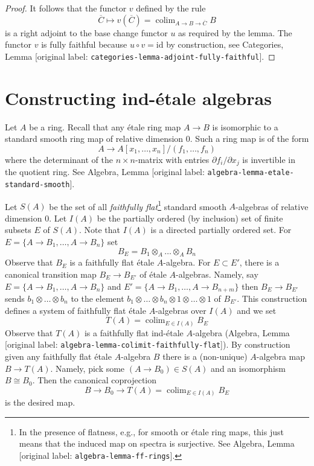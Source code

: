 \documentclass[10pt,a4paper]{article}
\theoremstyle{plain}
\theoremstyle{definition}
\theoremstyle{remark}
\numberwithin{equation}{subsection}
\def\colim{\mathop{\mathrm{colim}}\nolimits}
\begin{document}
\begin{proof}
\medskip\noindent
It follows that the functor $v$ defined by the rule
$$
\overline{C} 
\longmapsto
v(\overline{C}) = \colim_{A \to B \to \overline{C}} B
$$
is a right adjoint to the base change functor $u$ as required by the lemma.
The functor $v$ is fully faithful because
$u \circ v = \text{id}$ by construction, see
Categories, Lemma \textnormal{[original label: \nolinkurl{categories-lemma-adjoint-fully-faithful}]}.
\end{proof}









\section{Constructing ind-\'etale algebras}
\label{section-construction-ind-etale}

\noindent
Let $A$ be a ring. Recall that any \'etale ring map $A \to B$ is isomorphic
to a standard smooth ring map of relative dimension $0$. Such a ring map
is of the form
$$
A \longrightarrow A[x_1, \ldots, x_n]/(f_1, \ldots, f_n)
$$
where the determinant of the $n \times n$-matrix with entries
$\partial f_i/\partial x_j$ is invertible in the quotient ring. See
Algebra, Lemma \textnormal{[original label: \nolinkurl{algebra-lemma-etale-standard-smooth}]}.

\medskip\noindent
Let $S(A)$ be the set of all {\it faithfully flat}\footnote{In the presence
of flatness, e.g., for smooth or \'etale ring maps,
this just means that the induced map on spectra is surjective. See
Algebra, Lemma \textnormal{[original label: \nolinkurl{algebra-lemma-ff-rings}]}.}
standard smooth $A$-algebras of relative dimension $0$.
Let $I(A)$ be the partially ordered (by inclusion) set of finite
subsets $E$ of $S(A)$. Note that $I(A)$ is a directed partially
ordered set. For $E = \{A \to B_1, \ldots, A \to B_n\}$ set
$$
B_E = B_1 \otimes_A \ldots \otimes_A B_n
$$
Observe that $B_E$ is a faithfully flat \'etale $A$-algebra.
For $E \subset E'$, there is a canonical transition map $B_E \to B_{E'}$
of \'etale $A$-algebras. Namely, say $E = \{A \to B_1, \ldots, A \to B_n\}$
and $E' = \{A \to B_1, \ldots, A \to B_{n + m}\}$ then
$B_E \to B_{E'}$ sends $b_1 \otimes \ldots \otimes b_n$ to the
element $b_1 \otimes \ldots \otimes b_n \otimes 1 \otimes \ldots \otimes 1$
of $B_{E'}$. This construction defines a system of faithfully flat
\'etale $A$-algebras over $I(A)$ and we set
$$
T(A) = \colim_{E \in I(A)} B_E
$$
Observe that $T(A)$ is a faithfully flat ind-\'etale $A$-algebra
(Algebra, Lemma \textnormal{[original label: \nolinkurl{algebra-lemma-colimit-faithfully-flat}]}). By construction
given any faithfully flat \'etale $A$-algebra $B$ there is a (non-unique)
$A$-algebra map $B \to T(A)$. Namely, pick some $(A \to B_0) \in S(A)$
and an isomorphism $B \cong B_0$. Then the canonical coprojection
$$
B \to B_0 \to 
T(A) = \colim_{E \in I(A)} B_E
$$
is the desired map.
\end{document}
